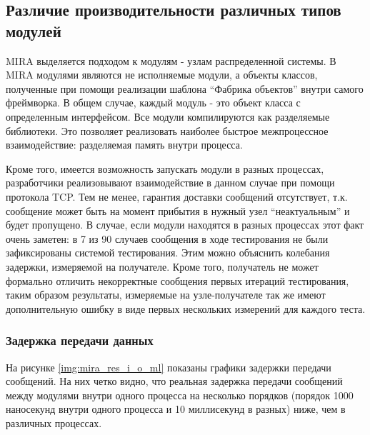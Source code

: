 \subsection{Различие производительности различных типов модулей}
MIRA выделяется подходом к модулям - узлам распределенной системы. В MIRA модулями являются не исполняемые модули, а объекты классов, полученные при помощи реализации шаблона \enquote{Фабрика объектов} внутри самого фреймворка. В общем случае, каждый модуль - это объект класса с определенным интерфейсом. Все модули компилируются как разделяемые библиотеки. Это позволяет реализовать наиболее быстрое межпроцессное взаимодействие: разделяемая память внутри процесса. 

Кроме того, имеется возможность запускать модули в разных процессах, разработчики реализовывают взаимодействие в данном случае при помощи протокола TCP. Тем не менее, гарантия доставки сообщений отсутствует, т.к. сообщение может быть на момент прибытия в нужный узел \enquote{неактуальным} и будет пропущено. В случае, если модули находятся в разных процессах этот факт очень заметен: в 7 из 90 случаев сообщения в ходе тестирования не были зафиксированы системой тестирования. Этим можно объяснить колебания задержки, измеряемой на получателе. Кроме того, получатель не может формально отличить некорректные сообщения первых итераций тестирования, таким образом результаты, измеряемые на узле-получателе так же имеют дополнительную ошибку в виде первых нескольких измерений для каждого теста.

\subsubsection{Задержка передачи данных}

На рисунке \ref{img:mira_res_i_o_ml} показаны графики задержки передачи сообщений. На них четко видно, что реальная задержка передачи сообщений между модулями внутри одного процесса на несколько порядков (порядок 1000 наносекунд внутри одного процесса и 10 миллисекунд в разных) ниже, чем в различных процессах. 


